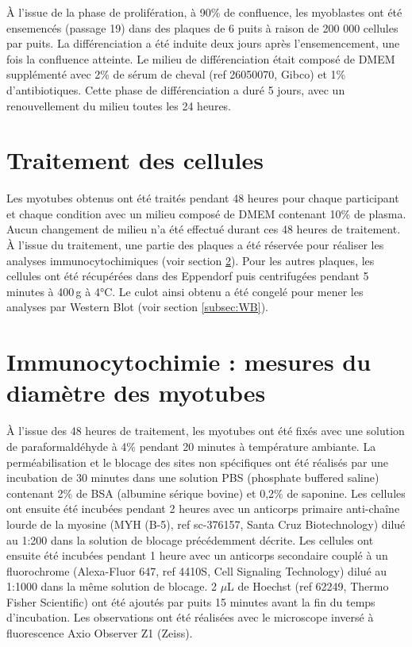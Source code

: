 \documentclass[11pt]{report}
\begin{document}
À l'issue de la phase de prolifération, à 90\% de confluence, les myoblastes ont été ensemencés (passage 19) dans des plaques de 6 puits à raison de 200 000 cellules par puits. La différenciation a été induite deux jours après l'ensemencement, une fois la confluence atteinte. Le milieu de différenciation était composé de DMEM supplémenté avec 2\% de sérum de cheval (ref 26050070, Gibco) et 1\% d'antibiotiques. Cette phase de différenciation a duré 5 jours, avec un renouvellement du milieu toutes les 24 heures.

\section{Traitement des cellules}

Les myotubes obtenus ont été traités pendant 48 heures pour chaque participant et chaque condition avec un milieu composé de DMEM contenant 10\% de plasma. Aucun changement de milieu n'a été effectué durant ces 48 heures de traitement. À l'issue du traitement, une partie des plaques a été réservée pour réaliser les analyses immunocytochimiques (voir section \ref{subsec:immcyto}). Pour les autres plaques, les cellules ont été récupérées dans des Eppendorf puis centrifugées pendant 5 minutes à 400\,g à 4°C. Le culot ainsi obtenu a été congelé pour mener les analyses par Western Blot (voir section \ref{subsec:WB}).

\section{Immunocytochimie : mesures du diamètre des myotubes}
\label{subsec:immcyto}

À l'issue des 48 heures de traitement, les myotubes ont été fixés avec une solution de paraformaldéhyde à 4\% pendant 20 minutes à température ambiante. La perméabilisation et le blocage des sites non spécifiques ont été réalisés par une incubation de 30 minutes dans une solution PBS (phosphate buffered saline) contenant 2\% de BSA (albumine sérique bovine) et 0,2\% de saponine. Les cellules ont ensuite été incubées pendant 2 heures avec un anticorps primaire anti-chaîne lourde de la myosine (MYH (B-5), ref sc-376157, Santa Cruz Biotechnology) dilué au 1:200 dans la solution de blocage précédemment décrite. Les cellules ont ensuite été incubées pendant 1 heure avec un anticorps secondaire couplé à un fluorochrome (Alexa-Fluor 647, ref 4410S, Cell Signaling Technology) dilué au 1:1000 dans la même solution de blocage. 2 $\mu$L de Hoechst (ref 62249, Thermo Fisher Scientific) ont été ajoutés par puits 15 minutes avant la fin du temps d'incubation. Les observations ont été réalisées avec le microscope inversé à fluorescence Axio Observer Z1 (Zeiss).
\end{document}
